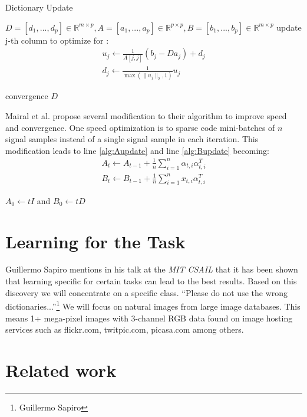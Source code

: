 \begin{algorithm}[H]
\caption{Dictionary Update}
\label{alg:update}
\begin{algorithmic}[1]
\REQUIRE $D=[d_1,...,d_p] \in \mathbb{R}^{m \times p}, A=[a_1,...,a_p] \in \mathbb{R}^{p \times p}, B=[b_1,...,b_p] \in \mathbb{R}^{m \times p}$
\REPEAT
{}
\STATE update j-th column to optimize for :
\begin{align*}
u_j \gets \frac{1}{A[j,j]}\left(b_j-Da_j\right)+d_j \\
d_j \gets \frac{1}{\max\left(\lVert u_j \rVert_2,1\right)} u_j
\end{align*}

\ENDFOR
\UNTIL convergence 
\RETURN $D$
\end{algorithmic}
\end{algorithm}
Mairal et al. propose several modification to their algorithm to improve speed
and convergence. One speed optimization is to sparse code mini-batches of $n$
signal samples instead of a single signal sample in each iteration. This
modification leads to line \ref{alg:Aupdate} and line \ref{alg:Bupdate}
becoming:
\begin{align}
A_t \gets A_{t-1} + \frac{1}{n}\sum_{i=1}^{n}\alpha_{t,i}\alpha_{t,i}^T\\
B_t \gets B_{t-1} + \frac{1}{n}\sum_{i=1}^{n}x_{t,i}\alpha_{t,i}^T
\end{align}

$A_0  \gets tI$ and $B_0 \gets tD$




\section{Learning for the Task}
\label{sec:learnForTheTask}
Guillermo Sapiro mentions in his talk\cite{sapiroSlides} at the \emph{MIT CSAIL}
that it has been shown that learning specific for certain tasks can lead to the
best results.  Based on this discovery we will concentrate on a specific class. 
``Please do not use the wrong dictionaries...''\footnote{Guillermo Sapiro}
We will focus on natural images from large image databases. This means 1+
mega-pixel images with 3-channel RGB data found on image hosting services such
as flickr.com, twitpic.com, picasa.com among others.


\section{Related work}
\label{sec:related_dictionarie}

